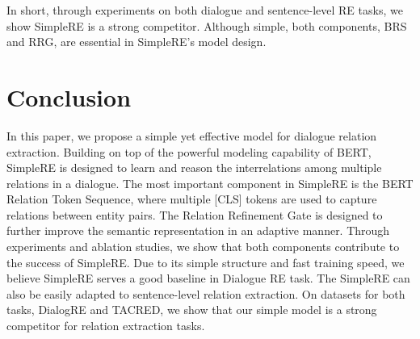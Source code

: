 \documentclass{article}
\begin{document}
In short, through experiments on both dialogue and sentence-level RE tasks, we show SimpleRE is a strong competitor. Although simple, both components, BRS and RRG, are essential in SimpleRE's model design. 

\section{Conclusion}
In this paper, we propose a simple yet effective model for dialogue relation extraction. Building on top of the powerful modeling capability of BERT, SimpleRE is designed to learn and reason the interrelations among multiple relations in a dialogue. The most important component in SimpleRE is the BERT Relation Token Sequence, where multiple [CLS] tokens are used to capture relations between entity pairs. The Relation Refinement Gate is designed to further improve the semantic representation in an adaptive manner. Through experiments and ablation studies, we show that both components contribute to the success of SimpleRE. Due to its simple structure and fast training speed, we believe SimpleRE serves a good baseline in Dialogue RE task. The SimpleRE can also be easily adapted to sentence-level relation extraction. On datasets for both tasks, DialogRE and TACRED, we show that our simple model is a strong competitor for relation extraction tasks. 

\vfill\pagebreak



\end{document}
